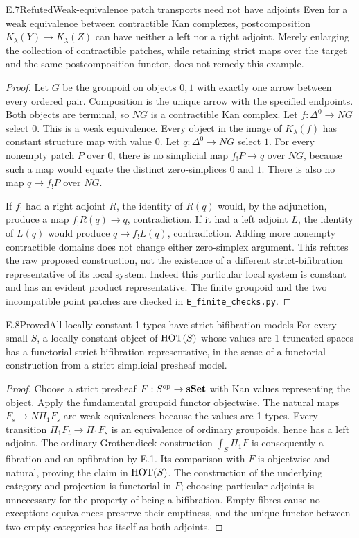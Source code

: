 \begin{statement}{E.7}{Refuted}{Weak-equivalence patch transports need not have adjoints}
Even for a weak equivalence between contractible Kan complexes, postcomposition $K_\lambda(Y)\to K_\lambda(Z)$ can have neither a left nor a right adjoint. Merely enlarging the collection of contractible patches, while retaining strict maps over the target and the same postcomposition functor, does not remedy this example.
\end{statement}
\begin{proof}
Let $G$ be the groupoid on objects $0,1$ with exactly one arrow between every ordered pair. Composition is the unique arrow with the specified endpoints. Both objects are terminal, so $NG$ is a contractible Kan complex. Let $f:\Delta^0\to NG$ select $0$. This is a weak equivalence. Every object in the image of $K_\lambda(f)$ has constant structure map with value $0$. Let $q:\Delta^0\to NG$ select $1$. For every nonempty patch $P$ over $0$, there is no simplicial map $f_!P\to q$ over $NG$, because such a map would equate the distinct zero-simplices $0$ and $1$. There is also no map $q\to f_!P$ over $NG$.

If $f_!$ had a right adjoint $R$, the identity of $R(q)$ would, by the adjunction, produce a map $f_!R(q)\to q$, contradiction. If it had a left adjoint $L$, the identity of $L(q)$ would produce $q\to f_!L(q)$, contradiction. Adding more nonempty contractible domains does not change either zero-simplex argument. This refutes the raw proposed construction, not the existence of a different strict-bifibration representative of its local system. Indeed this particular local system is constant and has an evident product representative. The finite groupoid and the two incompatible point patches are checked in \texttt{E\_finite\_checks.py}.
\end{proof}

\begin{statement}{E.8}{Proved}{All locally constant 1-types have strict bifibration models}
For every small $S$, a locally constant object of $\mathrm{HOT}(S)$ whose values are 1-truncated spaces has a functorial strict-bifibration representative, in the sense of a functorial construction from a strict simplicial presheaf model.
\end{statement}
\begin{proof}
Choose a strict presheaf $F:S^{\mathrm{op}}\to\mathbf{sSet}$ with Kan values representing the object. Apply the fundamental groupoid functor objectwise. The natural maps $F_s\to N\Pi_1F_s$ are weak equivalences because the values are 1-types. Every transition $\Pi_1F_t\to\Pi_1F_s$ is an equivalence of ordinary groupoids, hence has a left adjoint. The ordinary Grothendieck construction $\int_S\Pi_1F$ is consequently a fibration and an opfibration by E.1. Its comparison with $F$ is objectwise and natural, proving the claim in $\mathrm{HOT}(S)$. The construction of the underlying category and projection is functorial in $F$; choosing particular adjoints is unnecessary for the property of being a bifibration. Empty fibres cause no exception: equivalences preserve their emptiness, and the unique functor between two empty categories has itself as both adjoints.
\end{proof}


